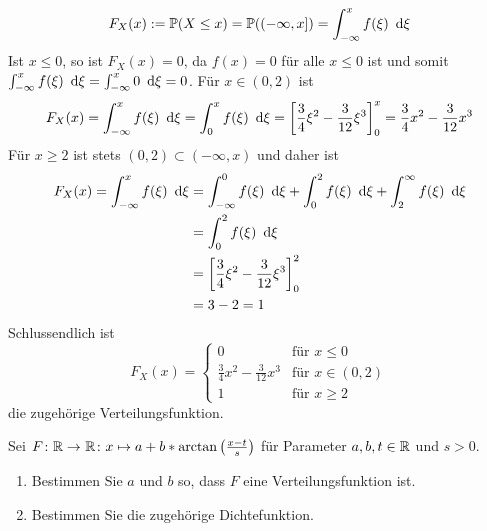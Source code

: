 \begin{exercisePage}
\begin{enumerate}[leftmargin=*, label=(\alph*)]
\begin{equation*}
            F_X(x) \mathrel{:=} \mathbb{P}(X \leq x) = \mathbb{P}( (-\infty, x]) = \int_{-\infty}^x f(\xi) \enskip \mathrm{d}\xi
        \end{equation*}
        Ist $x \leq 0$, so ist $F_X(x) = 0$, da $f(x) = 0$ für alle $x \leq 0$ ist und somit $\int_{-\infty}^x f(\xi) \enskip \mathrm{d}\xi = \int_{-\infty}^x 0 \enskip \mathrm{d}\xi = 0$. Für $x \in (0,2)$ ist 
        \begin{equation*}
            F_X(x) = \int_{-\infty}^x f(\xi) \enskip \mathrm{d}\xi = \int_0^x f(\xi) \enskip \mathrm{d}\xi = \left[ \frac{3}{4} \xi^2 - \frac{3}{12} \xi^3 \right]_0^x = \frac{3}{4} x^2 - \frac{3}{12} x^3
        \end{equation*}
        Für $x \geq 2$ ist stets $(0,2) \subset (-\infty, x)$ und daher ist
        \begin{equation*}
            \begin{aligned}
            F_X(x) = \int_{-\infty}^x f(\xi) \enskip \mathrm{d}\xi 
            &= \int_{-\infty}^0 f(\xi) \enskip \mathrm{d}\xi + \int_0^2 f(\xi) \enskip \mathrm{d}\xi + \int_2^\infty f(\xi) \enskip \mathrm{d}\xi \\
            &= \int_0^2 f(\xi) \enskip \mathrm{d}\xi \\
            &= \left[ \frac{3}{4} \xi^2 - \frac{3}{12} \xi^3 \right]_0^2 \\
            &= 3-2 = 1
            \end{aligned}
        \end{equation*}
        Schlussendlich ist
        \begin{equation*}
            F_X(x) = \begin{cases}
            0 & \text{für } x \leq 0 \\
            \frac{3}{4} x^2 - \frac{3}{12} x^3 & \text{für } x \in (0,2) \\
            1 & \text{für } x \geq 2
            \end{cases}
        \end{equation*}   
        die zugehörige Verteilungsfunktion.     
    \end{enumerate}

    \begin{exercise}
        Sei $\abb{F}{\R}{\R} \colon x \mapsto a + b * \arctan\left( \frac{x-t}{s} \right)$ für Parameter $a,b,t \in \mathbb{R}$ und $s > 0$.
        \begin{enumerate}[leftmargin=*, label=(\alph*)]
            \item Bestimmen Sie $a$ und $b$ so, dass $F$ eine Verteilungsfunktion ist.
            \item Bestimmen Sie die zugehörige Dichtefunktion.
        \end{enumerate}
    \end{exercise}
    

\end{exercisePage}
